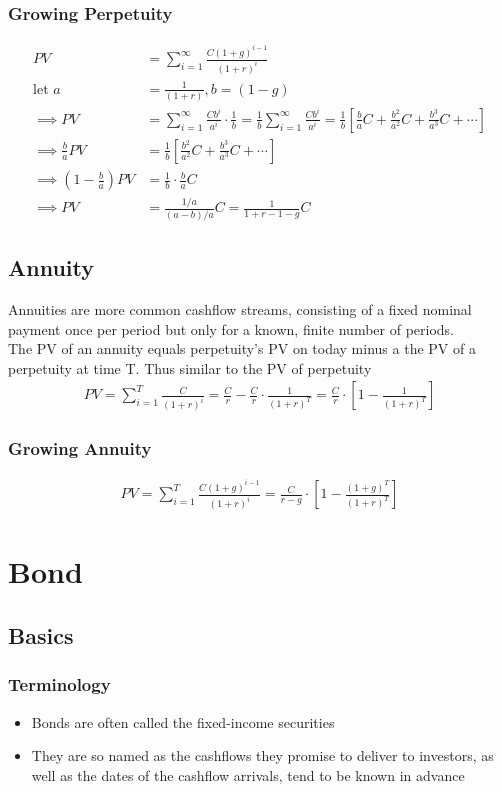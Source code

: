 \documentclass{article}
\theoremstyle{definition}
\theoremstyle{thrm}
\theoremstyle{lma}
\theoremstyle{ppst}
\theoremstyle{crlr}
\begin{document}
\subsubsection{Growing Perpetuity}
\begin{align*}
	PV &= \sum_{i=1}^\infty \frac{C(1+g)^{i-1}}{(1+r)^i}\\
	\text{let }a &= \frac{1}{(1+r)}, b = (1-g) \\
	\implies  PV &= \sum_{i=1}^\infty \frac{Cb^i}{a^i}\cdot\frac{1}{b} = \frac{1}{b}  \sum_{i=1}^\infty \frac{Cb^i}{a^i} = \frac{1}{b}[\frac{b}{a}C + \frac{b^2}{a^2}C + \frac{b^3}{a^3}C +\cdots]\\
	\implies \frac{b}{a}PV &= \frac{1}{b}[ \frac{b^2}{a^2}C + \frac{b^3}{a^3}C +\cdots]\\
	\implies (1-\frac{b}{a})PV &= \frac{1}{b}\cdot \frac{b}{a} C\\
	\implies PV &= \frac{1/a}{(a-b)/a}C = \frac{1}{1+r-1-g}C
\end{align*} 
\subsection{Annuity}
Annuities are more common cashflow streams, consisting of a fixed nominal payment once per period but only for a known, finite number of periods. \\
The PV of an annuity equals perpetuity's PV on today minus a the PV of a perpetuity at time T. Thus similar to the PV of perpetuity
\begin{align*}
	PV = \sum_{i=1}^T\frac{C}{(1+r)^i}=\frac{C}{r}-\frac{C}{r}\cdot \frac{1}{(1+r)^T} = \frac{C}{r}\cdot[1- \frac{1}{(1+r)^T}]
\end{align*}
\subsubsection{Growing Annuity}
\begin{align*}
	PV = \sum_{i=1}^T\frac{C(1+g)^{i-1}}{(1+r)^i}=\frac{C}{r-g}\cdot[1- \frac{(1+g)^T}{(1+r)^T}]
\end{align*}

\section{Bond}
\subsection{Basics}
\subsubsection{Terminology}
\begin{itemize}
	\item Bonds are often called the fixed-income securities
	\item They are so named as the cashflows they promise to deliver to investors, as well as the dates of the cashflow arrivals, tend to be known in advance
\end{itemize}
\end{document}
